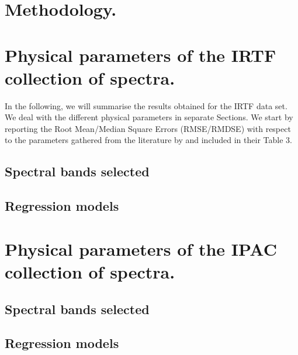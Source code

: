 \documentclass[a4paper,fleqn,usenatbib]{mnras}
\begin{document}





\section{Methodology.}
\label{sec:meth}


\section{Physical parameters of the IRTF collection of spectra.}
\label{sec:irtf}

In the following, we will summarise the results obtained for the IRTF
data set. We deal with the different physical parameters in separate
Sections. We start by reporting the Root Mean/Median Square Errors
(RMSE/RMDSE) with respect to the parameters gathered from the
literature by \cite{cesetti} and included in their Table 3.

\subsection{Spectral bands selected}

\subsection{Regression models}


\section{Physical parameters of the IPAC collection of spectra.}
\label{sec:ipac}

\subsection{Spectral bands selected}

\subsection{Regression models}

\end{document}
